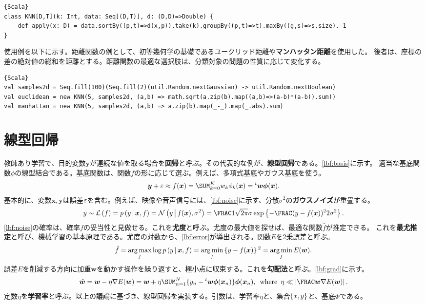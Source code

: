 \documentclass[10pt,a4paper]{book}
\begin{document}
\begin{Verbatim}{Scala}
class KNN[D,T](k: Int, data: Seq[(D,T)], d: (D,D)=>Double) {
	def apply(x: D) = data.sortBy((p,t)=>d(x,p)).take(k).groupBy((p,t)=>t).maxBy((g,s)=>s.size)._1
}
\end{Verbatim}

使用例を以下に示す。距離関数の例として、初等幾何学の基礎であるユークリッド距離や\textbf{マンハッタン距離}を使用した。
後者は、座標の差の絶対値の総和を距離とする。距離関数の最適な選択肢は、分類対象の問題の性質に応じて変化する。

\begin{Verbatim}{Scala}
val samples2d = Seq.fill(100)(Seq.fill(2)(util.Random.nextGaussian) -> util.Random.nextBoolean)
val euclidean = new KNN(5, samples2d, (a,b) => math.sqrt(a.zip(b).map((a,b)=>(a-b)*(a-b)).sum))
val manhattan = new KNN(5, samples2d, (a,b) => a.zip(b).map(_-_).map(_.abs).sum)
\end{Verbatim}

\section{線型回帰}

教師あり学習で、目的変数$\bm{y}$が連続な値を取る場合を\textbf{回帰}と呼ぶ。その代表的な例が、\textbf{線型回帰}である。\eqref{lbf:basis}に示す。
適当な基底関数$\phi$の線型結合である。基底関数は、関数$f$の形に応じて選ぶ。例えば、多項式基底やガウス基底を使う。
%
\begin{equation}
\label{eq:lbf:basis}
\bm{y} + \noise \approx f(\bm{x}) = \sum_{k=0}^K w_k \phi_k(\bm{x}) = \trans{\bm{w}}\bm{\phi}(\bm{x}).
\end{equation}
%
基本的に、変数$\bm{x},\bm{y}$は誤差$\varepsilon$を含む。例えば、映像や音声信号には、\eqref{lbf:noise}に示す、分散$\sigma^2$の\textbf{ガウスノイズ}が重畳する。
%
\begin{equation}
\label{eq:lbf:noise}
y \sim
\Lk{f} =
\prob{y}[\bm{x},f] =
\Nd{y}{f(\bm{x}),\sigma^2} =
\frac{1}{\sqrt{2\pi}\sigma}\exp\left\{-\frac{(y-f(\bm{x}))^2}{2\sigma^2}\right\}.
\end{equation}
%
\eqref{lbf:noise}の確率は、確率$f$の妥当性と見做せる。これを\textbf{尤度}と呼ぶ。尤度の最大値を探せば、最適な関数$\hat{f}$が推定できる。
これを\textbf{最尤推定}と呼び、機械学習の基本原理である。尤度の対数から、\eqref{lbf:error}が導出される。関数$E$を2乗誤差と呼ぶ。
%
\begin{equation}
\label{eq:lbf:error}
\hat{f} =
\argmax_f \log \prob{y}[\bm{x},f] =
\argmin_f \seq{y-f(\bm{x})}^2 =
\argmin_f E(\bm{w}).
\end{equation}
%
誤差$E$を削減する方向に加重$\bm{w}$を動かす操作を繰り返すと、極小点に収束する。これを\textbf{勾配法}と呼ぶ。\eqref{lbf:grad}に示す。
%
\begin{equation}
\label{eq:lbf:grad}
\hat{\bm{w}} = \bm{w} - \eta \nabla E(\bm{w}) = \bm{w} + \eta \sum_{n=1}^N \{y_n - \trans{\bm{w}} \bm{\phi}(\bm{x}_n)\} \bm{\phi}(\bm{x}_n),
\where
\eta \ll \abs{\frac{\bm{w}}{\nabla E(\bm{w})}}.
\end{equation}
%
定数$\eta$を\textbf{学習率}と呼ぶ。以上の議論に基づき、線型回帰を実装する。引数は、学習率$\eta$と、集合$\seqxy$と、基底$\Phi$である。
\end{document}
